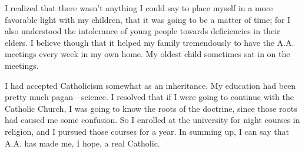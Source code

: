 \begin{biblechapter}
I realized that there wasn’t anything I could say to place myself in a more favorable light with my children, that it was going to be a matter of time; for I also understood the intolerance of young people towards deficiencies in their elders. I believe though that it helped my family tremendously to have the A.A. meetings every week in my own home. My oldest child sometimes sat in on the meetings.

I had accepted Catholicism somewhat as an inheritance. My education had been pretty much pagan—science. I resolved that if I were going to continue with the Catholic Church, I was going to know the roots of the doctrine, since those roots had caused me some confusion. So I enrolled at the university for night courses in religion, and I pursued those courses for a year. In summing up, I can say that A.A. has made me, I hope, a real Catholic.
\end{biblechapter}
